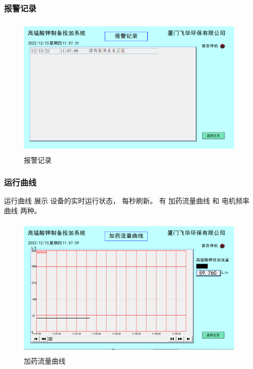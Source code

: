 \documentclass[UTF8,a4paper,12pt,titlepage]{ctexart}
\begin{document}
        \newpage

        \subsubsection{报警记录}
            \begin{figure}[h]
                \centering
                \includegraphics[height=7cm]{g8.PNG}
                \caption{报警记录}\label{fig:p13}
            \end{figure}

        \subsubsection{运行曲线}
            运行曲线 展示 设备的实时运行状态，
            每秒刷新。
             有 加药流量曲线 和 电机频率曲线 两种。
            \begin{figure}[h]
                \centering
                \includegraphics[height=7cm]{g9.PNG}
                \caption{加药流量曲线}\label{fig:p14}
            \end{figure}

            \newpage
\end{document}
